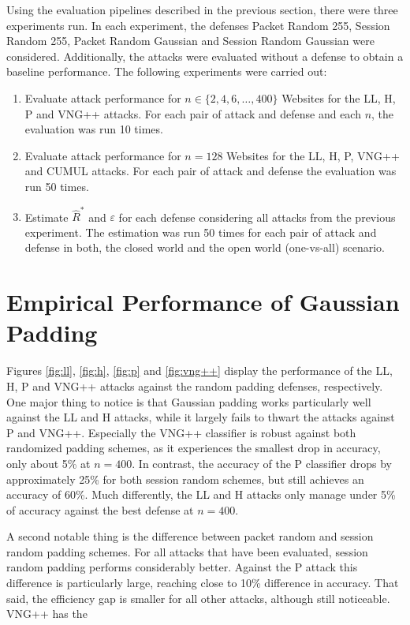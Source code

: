 \documentclass[
	ruledheaders=chapter,
	class=report,
	thesis={type=master, department=inf},
	accentcolor=1c,
	custommargins=true,
	marginpar=false,
	parskip=half-,
	fontsize=11pt,
]{tudapub}
\begin{document}
	Using the evaluation pipelines described in the previous section, there were three experiments run. In each experiment, the defenses Packet Random 255, Session Random 255, Packet Random Gaussian and Session Random Gaussian were considered. Additionally, the attacks were evaluated without a defense to obtain a baseline performance. The following experiments were carried out:
	
	\begin{enumerate}
		\item Evaluate attack performance for $n \in \{2, 4, 6, \ldots, 400\}$ Websites for the LL, H, P and VNG++ attacks. For each pair of attack and defense and each $n$, the evaluation was run 10 times.
		\item Evaluate attack performance for $n = 128$ Websites for the LL, H, P, VNG++ and CUMUL attacks. For each pair of attack and defense the evaluation was run 50 times.
		\item Estimate $\widehat{R}^*$ and $\varepsilon$ for each defense considering all attacks from the previous experiment. The estimation was run 50 times for each pair of attack and defense in both, the closed world and the open world (one-vs-all) scenario.
	\end{enumerate}

	\section{Empirical Performance of Gaussian Padding}
	\label{performance}
	
	Figures \ref{fig:ll}, \ref{fig:h}, \ref{fig:p} and \ref{fig:vng++} display the performance of the LL, H, P and VNG++ attacks against the random padding defenses, respectively. One major thing to notice is that Gaussian padding works particularly well against the LL and H attacks, while it largely fails to thwart the attacks against P and VNG++. Especially the VNG++ classifier is robust against both randomized padding schemes, as it experiences the smallest drop in accuracy, only about 5\% at $n = 400$. In contrast, the accuracy of the P classifier drops by approximately 25\% for both session random schemes, but still achieves an accuracy of 60\%. Much differently, the LL and H attacks only manage under 5\% of accuracy against the best defense at $n = 400$.
	
	A second notable thing is the difference between packet random and session random padding schemes. For all attacks that have been evaluated, session random padding performs considerably better. Against the P attack this difference is particularly large, reaching close to 10\% difference in accuracy. That said, the efficiency gap is smaller for all other attacks, although still noticeable. VNG++ has the 
	
\end{document}
